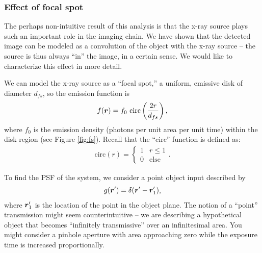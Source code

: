 \documentclass[mphy386-notes.tex]{subfiles}
\begin{document}
\subsubsection{Effect of focal spot}

The perhaps non-intuitive result of this analysis is that the x-ray source plays
such an important role in the imaging chain. We have shown that the detected
image can be modeled as a convolution of the object with the x-ray source -- the
source is thus always ``in'' the image, in a certain sense. We would like to
characterize this effect in more detail.

We can model the x-ray source as a ``focal spot,'' a uniform, emissive disk of
diameter $d_{fs}$, so the emission function is
\begin{align}
  f(\boldsymbol{r}) = f_0 \text{ circ}\left(\frac{2r}{d_{fs}}\right),
  \label{eq:fsdef}
\end{align}
where $f_0$ is the emission density (photons per unit area per unit time) within
the disk region (see Figure \ref{fig:fs}). Recall that the ``circ'' function is
defined as:
\begin{align}
  \text{circ}(r) =
  \begin{cases}
    1 & r \le 1\\
    0 & \text{else}
  \end{cases}.
\end{align}


To find the PSF of the system, we consider a point
object input described by
\begin{align}
  g(\boldsymbol{r}') = \delta(\boldsymbol{r}'-\boldsymbol{r}_1'),
  \label{eq:pinhole}
\end{align}
where $\boldsymbol{r}_1'$ is the location of the point in the object plane. The notion
of a ``point'' transmission might seem counterintuitive -- we are describing a
hypothetical object that becomes ``infinitely transmissive'' over an
infinitesimal area. You might consider a pinhole aperture with area
approaching zero while the exposure time is increased proportionally.
\end{document}
